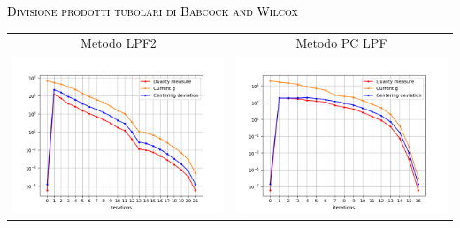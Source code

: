 \begin{frame}{\textsc{\LARGE \textcolor{black}{Divisione prodotti tubolari di Babcock and Wilcox}}}
	\centering
	\begin{tabular}{c@{}c}
		\small{Metodo LPF2} & \small{Metodo PC LPF} \\
		\includegraphics[scale = 0.33]{tub_LPF2}
		&\includegraphics[scale = 0.33]{tub_PCLPF2}\\ 
	\end{tabular}
\end{frame}

